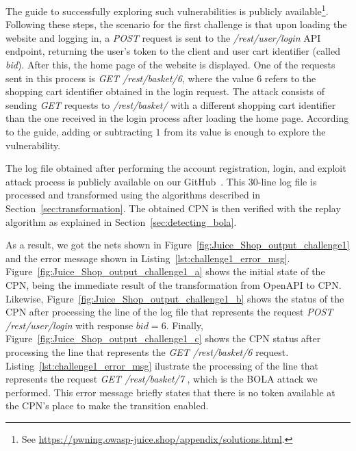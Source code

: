 The guide to successfully exploring such vulnerabilities is publicly available\footnote{See \url{https://pwning.owasp-juice.shop/appendix/solutions.html}.}. Following these steps, the scenario for the first challenge is that upon loading the website and logging in, a \textit{POST} request is sent to the \textit{/rest/user/login} API endpoint, returning the user's token to the client and user cart identifier (called \textit{bid}). After this, the home page of the website is displayed. One of the requests sent in this process is \textit{GET /rest/basket/6}, where the value $6$ refers to the shopping cart identifier obtained in the login request. The attack consists of sending \textit{GET} requests to \textit{/rest/basket/} with a different shopping cart identifier than the one received in the login process  after loading the home page. According to the guide, adding or subtracting $1$ from its value is enough to explore the vulnerability.

The log file obtained after performing the account registration, login, and exploit attack process is publicly available on our GitHub~\cite{links2cpn}. This 30-line log file is processed and transformed using the algorithms described in Section~\ref{sec:transformation}. The obtained CPN is then verified with the replay algorithm as explained in Section~\ref{sec:detecting_bola}. 

As a result, we got the nets shown in Figure~\ref{fig:Juice_Shop_output_challenge1}  and the error message shown in Listing~\ref{lst:challenge1_error_msg}. Figure~\ref{fig:Juice_Shop_output_challenge1_a} shows the initial state of the CPN, being the immediate result of the transformation from OpenAPI to CPN. Likewise, 
Figure~\ref{fig:Juice_Shop_output_challenge1_b} shows the status of the CPN after processing the line of the log file that represents the request \textit{POST /rest/user/login} with response $ bid=6$. Finally, 
Figure~\ref{fig:Juice_Shop_output_challenge1_c} shows the CPN status after processing the line that represents the \textit{GET /rest/basket/6} request. Listing~\ref{lst:challenge1_error_msg} ilustrate the processing of the line that represents the request \textit{GET /rest/basket/7} , which is the BOLA attack we performed. This error message briefly states that there is no token available at the CPN's place to make the transition enabled.

